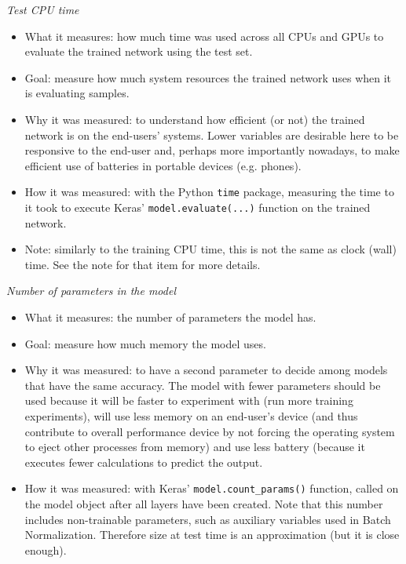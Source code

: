 \documentclass[../CAP6619_term_project_cgarbin.tex]{subfiles}
\begin{document}
\smallskip
\textit{Test CPU time}
\begin{itemize}
\item What it measures: how much time was used across all CPUs and GPUs to evaluate the trained network using the test set.
\item Goal: measure how much system resources the trained network uses when it is evaluating samples. 
\item Why it was measured: to understand how efficient (or not) the trained network is on the end-users' systems. Lower variables are desirable here to be responsive to the end-user and, perhaps more importantly nowadays, to make efficient use of batteries in portable devices (e.g. phones).
\item How it was measured: with the Python \verb|time| package, measuring the time to it took to execute Keras' \verb|model.evaluate(...)| function on the trained network.
\item Note: similarly to the training CPU time, this is not the same as clock (wall) time. See the note for that item for more details.
\end{itemize}

\smallskip
\textit{Number of parameters in the model}
\begin{itemize}
\item What it measures: the number of parameters the model has.
\item Goal: measure how much memory the model uses.
\item Why it was measured: to have a second parameter to decide among models that have the same accuracy. The model with fewer parameters should be used because it will be faster to experiment with (run more training experiments), will use less memory on an end-user's device (and thus contribute to overall performance device by not forcing the operating system to eject other processes from memory) and use less battery (because it executes fewer calculations to predict the output.
\item How it was measured: with Keras' \verb|model.count_params()| function, called on the model object after all layers have been created. Note that this number includes non-trainable parameters, such as auxiliary variables used in Batch Normalization. Therefore size at test time is an approximation (but it is close enough).
\end{itemize}
\end{document}
